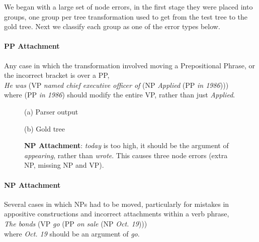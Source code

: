 We began with a large set of node errors, in the first stage they were placed
into groups, one group per tree transformation used to get from the test tree
to the gold tree.  Next we classify each group as one of the error types below.

\paragraph{PP Attachment} Any case in which the transformation involved moving a Prepositional Phrase, or the incorrect bracket is over a PP, \myeg \\ 
\emph{He was} (VP \emph{named chief executive officer of} (NP \emph{Applied} (PP \emph{in 1986}))) \\
where (PP \emph{in 1986}) should modify the entire VP, rather than just \emph{Applied}.

\begin{figure}
\begin{center}

\vspace{3mm}
(a) Parser output

\vspace{3mm}


(b) Gold tree
\end{center}
\derivspace
\caption{
	\label{fig:NP-attachment}
	\textbf{NP Attachment}: \emph{today} is too high, it should be the argument
	of \emph{appearing}, rather than \emph{wrote}.  This causes three node errors
	(extra NP, missing NP and VP).
}
\derivaftercompress
\end{figure}

\paragraph{NP Attachment} Several cases in which NPs had to be moved, particularly for mistakes in appositive constructions and incorrect attachments within a verb phrase, \myeg \\
\emph{The bonds} (VP \emph{go} (PP \emph{on sale} (NP \emph{Oct.\@\xspace 19}))) \\
where \emph{Oct.\@\xspace 19} should be an argument of \emph{go}.

